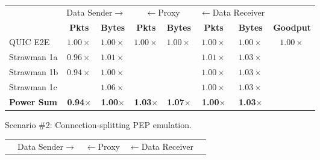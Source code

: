 \begin{figure}[ht]
\begin{subfigure}{\columnwidth}
  \setlength{\tabcolsep}{2pt}
  \footnotesize
  \centering
  \begin{tabular}{lccccccc}
    \toprule
    & \multicolumn{2}{c}{Data Sender$\rightarrow$} & \multicolumn{2}{c}{$\leftarrow$Proxy} & \multicolumn{2}{c}{$\leftarrow$Data Receiver} & \\
    & \bf Pkts & \bf Bytes & \bf Pkts & \bf Bytes & \bf Pkts & \bf Bytes & \bf Goodput \\
    \midrule
    QUIC E2E & $1.00\times$ & $1.00\times$ & $1.00\times$ & $1.00\times$ & $1.00\times$ & $1.00\times$ & $1.00\times$ \\
    Strawman 1a & $0.96\times$ & $1.01\times$ & \cellcolor{LighterRed}{$2.02\times$} & \cellcolor{LightestRed}{$1.56\times$} & $1.01\times$ & $1.03\times$ & \cellcolor{LighterGreen}{$3.33\times$} \\
    Strawman 1b & $0.94\times$ & $1.00\times$ & \cellcolor{LighterRed}{$2.00\times$} & \cellcolor{LightestRed}{$1.78\times$} & $1.00\times$ & $1.03\times$ & \cellcolor{LightGreen}{$3.53\times$} \\
    Strawman 1c & \cellcolor{LightestRed}{$1.83\times$} & $1.06\times$ & \cellcolor{LighterRed}{$2.01\times$} & \cellcolor{LightestRed}{$1.83\times$} & $1.00\times$ & $1.03\times$ & \cellcolor{LightGreen}{$3.46\times$} \\
    \bf \textcolor{black!50!blue}{Power Sum}   & \textcolor{black!50!blue}{\bf 0.94$\times$} & \textcolor{black!50!blue}{\bf 1.00$\times$} & \textcolor{black!50!blue}{\bf 1.03$\times$} & \textcolor{black!50!blue}{\bf 1.07$\times$} & \textcolor{black!50!blue}{\bf 1.00$\times$} & \textcolor{black!50!blue}{\bf 1.03$\times$} & \cellcolor{LightGreen}{\textcolor{black!50!blue}{\bf 3.55$\times$}} \\
    \bottomrule
  \end{tabular}
  \caption{Scenario \#2: Connection-splitting PEP emulation.}
  \label{tab:packet-overhead:retx}
\end{subfigure}
\begin{subfigure}{\columnwidth}
  \setlength{\tabcolsep}{2pt}
  \footnotesize
  \centering
  \begin{tabular}{lccccccc}
    \toprule
    & \multicolumn{2}{c}{Data Sender$\rightarrow$} & \multicolumn{2}{c}{$\leftarrow$Proxy} & \multicolumn{2}{c}{$\leftarrow$Data Receiver} & \\

\end{tabular}
\end{subfigure}
\end{figure}

